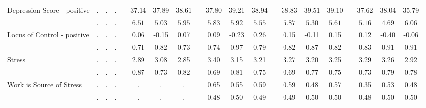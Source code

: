 \begin{center}
{\begin{longtable}{L{5cm} c c c p{.5cm} c c c p{.5cm} c c c p{.5cm} c c c p{.5cm} c c c}
 \quad Depression Score - positive & . &         . &         . & &     37.14 &     37.89 &     38.61 & &     37.80 &     39.21 &     38.94 & &     38.83 &     39.51 &     39.10 & &     37.62 &     38.04 &     35.79 \\*
 \quad & $\mathit{        .}$ & $\mathit{        .}$ & $\mathit{        .}$ & & $\mathit{     6.51}$ & $\mathit{     5.03}$ & $\mathit{     5.95}$ & & $\mathit{     5.83}$ & $\mathit{     5.92}$ & $\mathit{     5.55}$ & & $\mathit{     5.87}$ & $\mathit{     5.30}$ & $\mathit{     5.61}$ & & $\mathit{     5.16}$ & $\mathit{     4.69}$ & $\mathit{     6.06}$ \\[.2em]
 \quad Locus of Control - positive & . &         . &         . & &      0.06 &     -0.15 &      0.07 & &      0.09 &     -0.23 &      0.26 & &      0.15 &     -0.11 &      0.15 & &      0.12 &     -0.40 &     -0.06 \\*
 \quad & $\mathit{        .}$ & $\mathit{        .}$ & $\mathit{        .}$ & & $\mathit{     0.71}$ & $\mathit{     0.82}$ & $\mathit{     0.73}$ & & $\mathit{     0.74}$ & $\mathit{     0.97}$ & $\mathit{     0.79}$ & & $\mathit{     0.82}$ & $\mathit{     0.87}$ & $\mathit{     0.82}$ & & $\mathit{     0.83}$ & $\mathit{     0.91}$ & $\mathit{     0.91}$ \\[.2em]
 \quad Stress & . &         . &         . & &      2.89 &      3.08 &      2.85 & &      3.40 &      3.15 &      3.21 & &      3.27 &      3.20 &      3.25 & &      3.29 &      3.26 &      2.92 \\*
 \quad & $\mathit{        .}$ & $\mathit{        .}$ & $\mathit{        .}$ & & $\mathit{     0.87}$ & $\mathit{     0.73}$ & $\mathit{     0.82}$ & & $\mathit{     0.69}$ & $\mathit{     0.81}$ & $\mathit{     0.75}$ & & $\mathit{     0.69}$ & $\mathit{     0.77}$ & $\mathit{     0.75}$ & & $\mathit{     0.73}$ & $\mathit{     0.79}$ & $\mathit{     0.78}$ \\[.2em]
 \quad Work is Source of Stress & . &         . &         . & &         . &         . &         . & &      0.65 &      0.55 &      0.59 & &      0.59 &      0.48 &      0.57 & &      0.35 &      0.53 &      0.48 \\*
 \quad & $\mathit{        .}$ & $\mathit{        .}$ & $\mathit{        .}$ & & $\mathit{        .}$ & $\mathit{        .}$ & $\mathit{        .}$ & & $\mathit{     0.48}$ & $\mathit{     0.50}$ & $\mathit{     0.49}$ & & $\mathit{     0.49}$ & $\mathit{     0.50}$ & $\mathit{     0.50}$ & & $\mathit{     0.48}$ & $\mathit{     0.50}$ & $\mathit{     0.50}$ \\[.2em]

\end{longtable}}
\end{center}

